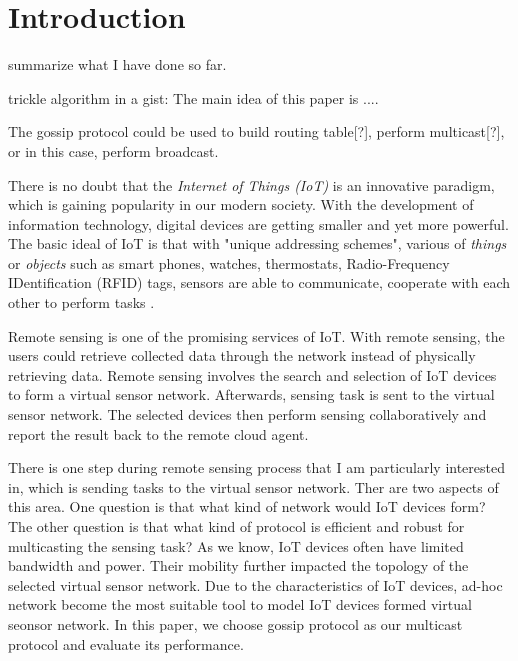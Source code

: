 \chapter{Introduction}



summarize what I have done so far.

trickle algorithm in a gist: 
The main idea of this paper is ....

The gossip protocol could be used to build routing table[?], perform multicast[?], or in this case, perform broadcast.

There is no doubt that the \emph{Internet of Things (IoT)} is an innovative paradigm, \cite{Atzori} which is gaining popularity in our modern society.  With the development of information technology, digital devices are getting smaller and yet more powerful. The basic ideal of IoT is that with "unique addressing schemes", various of \emph{things} or \emph{objects} such as smart phones, watches, thermostats, Radio-Frequency IDentification (RFID) tags, sensors are able to communicate, cooperate with each other to perform tasks \cite{Atzori}.  


Remote sensing is one of the promising services of IoT. With remote sensing, the users could retrieve collected data through the network instead of physically retrieving data. Remote sensing involves the search and selection of IoT devices to form a virtual sensor network. Afterwards, sensing task is sent to the virtual sensor network. The selected devices then perform sensing collaboratively and report the result back to the remote cloud agent. 

There is one step during remote sensing process that I am particularly interested in, which is sending tasks to the virtual sensor network. Ther are two aspects of this area. One question is that what kind of network would IoT devices form? The other question is that what kind of protocol is efficient and robust for multicasting the sensing task? As we know, IoT devices often have limited bandwidth and power. Their mobility further impacted the topology of the selected virtual sensor network. Due to the characteristics of IoT devices, ad-hoc network become the most suitable tool to model IoT devices formed virtual seonsor network. In this paper, we choose gossip protocol\cite{gossip} as our multicast protocol and evaluate its performance.


